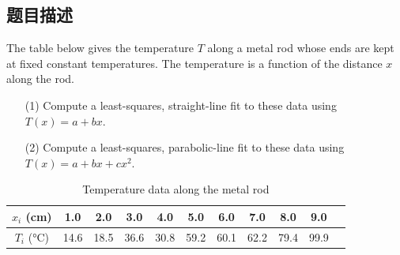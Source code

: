 \subsection{题目描述}
\noindent The table below gives the temperature \( T \) along a metal rod whose ends are kept at fixed constant temperatures. The temperature is a function of the distance \( x \) along the rod.
\begin{itemize}
    \item[(1)] Compute a least-squares, straight-line fit to these data using \( T(x) = a + bx \).
    \item[(2)] Compute a least-squares, parabolic-line fit to these data using \( T(x) = a + bx + cx^2 \).
\end{itemize}


\begin{table}[H]
    \centering
    \caption{Temperature data along the metal rod}
    \begin{tabular}{@{}ccccccccccc@{}}
        \toprule
        \(x_i\) (cm) & 1.0 & 2.0 & 3.0 & 4.0 & 5.0 & 6.0 & 7.0 & 8.0 & 9.0 \\ 
        \midrule
        \(T_i\) (°C) & 14.6 & 18.5 & 36.6 & 30.8 & 59.2 & 60.1 & 62.2 & 79.4 & 99.9 \\ 
        \bottomrule
    \end{tabular}
\end{table}

